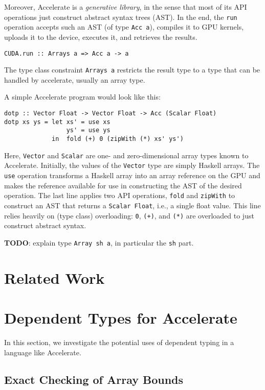 \documentclass{llncs}
\begin{document}
Moreover, Accelerate is a \emph{generative library}, in the sense that
most of its API operations just construct abstract syntax trees (AST). In the end,
the \verb+run+ operation accepts such an AST (of type \verb+Acc a+),
compiles it to GPU kernels, 
uploads it to the device, executes it, and retrieves the results. 
\begin{verbatim}
CUDA.run :: Arrays a => Acc a -> a
\end{verbatim}
The type class constraint \verb+Arrays a+ restricts the result type to
a type that can be handled by accelerate, usually an array type.

A simple Accelerate program would look like this:
\begin{verbatim}
dotp :: Vector Float -> Vector Float -> Acc (Scalar Float)
dotp xs ys = let xs' = use xs
                 ys' = use ys
             in  fold (+) 0 (zipWith (*) xs' ys')
\end{verbatim}
Here, \verb+Vector+ and \verb+Scalar+ are one- and zero-dimensional
array types known to Accelerate. Initially, the values of the
\verb+Vector+ type are simply Haskell arrays. The \verb+use+ operation
transforms a Haskell array into an array reference on the GPU and
makes the reference available for use in constructing the AST of the
desired operation. The last line applies two API operations,
\texttt{fold} and \texttt{zipWith} to construct an AST that returns a
\texttt{Scalar Float}, i.e., a single float value. This line relies
heavily on (type class) overloading: \texttt{0}, \texttt{(+)}, and
\texttt{(*)} are overloaded to just construct abstract syntax. 

\textbf{TODO}: explain type \texttt{Array sh a}, in particular the
\texttt{sh} part.

\section{Related Work}
\label{sec:related-work}

\section{Dependent Types for Accelerate}
\label{sec:dependent-types}

In this section, we investigate the potential uses of dependent typing
in a language like Accelerate.

\subsection{Exact Checking of Array Bounds}
\label{sec:exact-checking-array}
\end{document}
